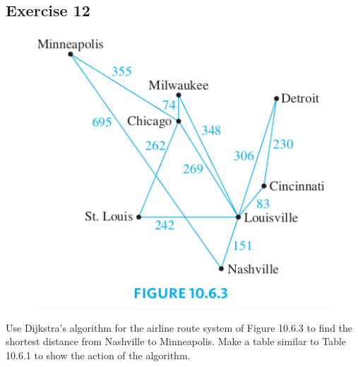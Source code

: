 \documentclass[14pt]{extarticle}
\begin{document}
\subsection{Exercise 12}
\begin{figure}[ht!]
    \centering
    \includegraphics[scale=0.5]{../images/10.6.12.png}
\end{figure}

Use Dijkstra’s algorithm for the airline route system of Figure 10.6.3 to find the shortest distance from Nashville to
Minneapolis. Make a table similar to Table 10.6.1 to show the action of the algorithm.
\end{document}
